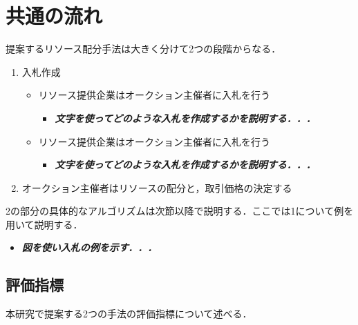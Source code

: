 \hypertarget{ux5171ux901aux306eux6d41ux308c}{%
\section{共通の流れ}\label{ux5171ux901aux306eux6d41ux308c}}

提案するリソース配分手法は大きく分けて2つの段階からなる．

\begin{enumerate}
\def\labelenumi{\arabic{enumi}.}
\tightlist
\item
  入札作成

  \begin{itemize}
  \tightlist
  \item
    リソース提供企業はオークション主催者に入札を行う

    \begin{itemize}
    \tightlist
    \item
      \textbf{\emph{文字を使ってどのような入札を作成するかを説明する．．．}}
    \end{itemize}
  \item
    リソース提供企業はオークション主催者に入札を行う

    \begin{itemize}
    \tightlist
    \item
      \textbf{\emph{文字を使ってどのような入札を作成するかを説明する．．．}}
    \end{itemize}
  \end{itemize}
\item
  オークション主催者はリソースの配分と，取引価格の決定する
\end{enumerate}

2の部分の具体的なアルゴリズムは次節以降で説明する．ここでは1について例を用いて説明する．

\begin{itemize}
\tightlist
\item
  \textbf{\emph{図を使い入札の例を示す．．．}}
\end{itemize}

\hypertarget{ux8a55ux4fa1ux6307ux6a19}{%
\subsection{評価指標}\label{ux8a55ux4fa1ux6307ux6a19}}

本研究で提案する2つの手法の評価指標について述べる．

